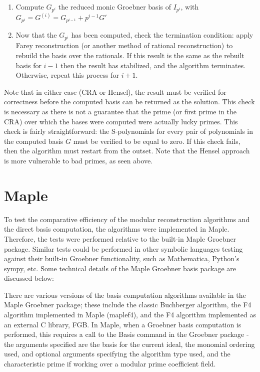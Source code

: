 \documentclass[letterpaper,12pt,titlepage,oneside,final]{book}
\begin{document}
\begin{enumerate}
  \item Compute ${G_{p^i}}$ the reduced monic Groebner basis of ${I_{p^i}}$, with ${G_{p^i} = G^{(i)} = G_{p^{i-1}} + p^{i-1}G'}$
  \item Now that the ${G_{p^i}}$ has been computed, check the termination condition: apply Farey reconstruction (or another method of rational reconstruction) to rebuild the basis over the rationals.  If this result is the same as the rebuilt basis for ${i-1}$ then the result has stabilized, and the algorithm terminates.  Otherwise, repeat this process for ${i+1}$.
\end{enumerate}      

Note that in either case (CRA or Hensel), the result must be verified for correctness before the computed basis can be returned as the solution.  This check is necessary as there is not a guarantee that the prime (or first prime in the CRA) over which the bases were computed were actually lucky primes.  This check is fairly straightforward: the S-polynomials for every pair of polynomials in the computed basis ${G}$ must be verified to be equal to zero.  If this check fails, then the algorithm must restart from the outset.  Note that the Hensel approach is more vulnerable to bad primes, as seen above.

\section{Maple}

To test the comparative efficiency of the modular reconstruction algorithms and the direct basis computation, the algorithms were implemented in Maple.  Therefore, the tests were performed relative to the built-in Maple Groebner package.  Similar tests could be performed in other symbolic languages testing against their built-in Groebner functionality, such as Mathematica, Python's sympy, etc.  Some technical details of the Maple Groebner basis package are discussed below:

There are various versions of the basis computation algorithms available in the Maple Groebner package; these include the classic Buchberger algorithm, the F4 algorithm implemented in Maple (maplef4), and the F4 algorithm implemented as an external C library, FGB.  In Maple, when a Groebner basis computation is performed, this requires a call to the Basis command in the Groebner package - the arguments specified are the basis for the current ideal, the monomial ordering used, and optional arguments specifying the algorithm type used, and the characteristic prime if working over a modular prime coefficient field.   
\end{document}
